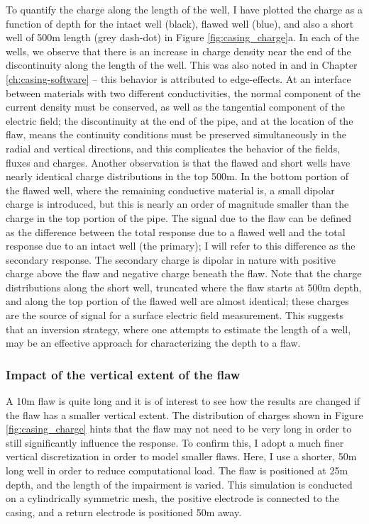 To quantify the charge along the length of the well, I have plotted the charge as a function of depth for the intact well (black), flawed well (blue), and also a short well of 500m length (grey dash-dot) in Figure \ref{fig:casing_charge}a. In each of the wells, we observe that there is an increase in charge density near the end of the discontinuity along the length of the well. This was also noted in \cite{Griffiths1997} and in Chapter \ref{ch:casing-software} -- this behavior is attributed to edge-effects. At an interface between materials with two different conductivities, the normal component of the current density must be conserved, as well as the tangential component of the electric field; the discontinuity at the end of the pipe, and at the location of the flaw, means the continuity conditions must be preserved simultaneously in the radial and vertical directions, and this complicates the behavior of the fields, fluxes and charges. Another observation is that the flawed and short wells have nearly identical charge distributions in the top 500m. In the bottom portion of the flawed well, where the remaining conductive material is, a small dipolar charge is introduced, but this is nearly an order of magnitude smaller than the charge in the top portion of the pipe. The signal due to the flaw can be defined as the difference between the total response due to a flawed well and the total response due to an intact well (the primary); I  will refer to this difference as the secondary response. The secondary charge is dipolar in nature with positive charge above the flaw and negative charge beneath the flaw. Note that the charge distributions along the short well, truncated where the flaw starts at 500m depth, and along the top portion of the flawed well are almost identical; these charges are the source of signal for a surface electric field measurement. This suggests that an inversion strategy, where one attempts to estimate the length of a well, may be an effective approach for characterizing the depth to a flaw.




\subsubsection{Impact of the vertical extent of the flaw}

A 10m flaw is quite long and it is of interest to see how the results are changed if the flaw has a smaller vertical extent. The distribution of charges shown in Figure \ref{fig:casing_charge} hints that the flaw may not need to be very long in order to still significantly influence the response. To confirm this, I adopt a much finer vertical discretization in order to model smaller flaws. Here, I use a shorter, 50m long well in order to reduce computational load. The flaw is positioned at 25m depth, and the length of the impairment is varied. This simulation is conducted on a cylindrically symmetric mesh, the positive electrode is connected to the casing, and a return electrode is positioned 50m away.

